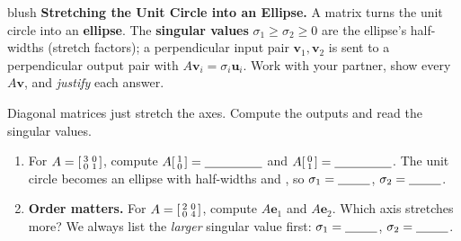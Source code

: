 \documentclass[10pt]{article}
\newcommand{\uu}{\mathbf{u}}
\newcommand{\vv}{\mathbf{v}}
\newcommand{\ee}{\mathbf{e}}
\begin{document}
\namepartnerperiod

\vspace{0.10in}

\begin{headlinebox}{blush}
\small\textbf{Stretching the Unit Circle into an Ellipse.} A matrix turns the unit circle into an
\textbf{ellipse}. The \textbf{singular values} $\sigma_1\ge\sigma_2\ge0$ are the ellipse's half-widths
(stretch factors); a perpendicular input pair $\vv_1,\vv_2$ is sent to a perpendicular output pair with
$A\vv_i=\sigma_i\uu_i$. Work with your partner, show every $A\vv$, and \emph{justify} each answer.
\end{headlinebox}

\vspace{0.10in}

\begin{tcolorbox}[colback=white, colframe=black!40, title=\textbf{Tier R --- Remediate},
    fonttitle=\bfseries, arc=1.5mm, left=3mm, right=3mm, top=2mm, bottom=2mm, breakable]
Diagonal matrices just stretch the axes. Compute the outputs and read the singular values.
\begin{enumerate}[leftmargin=1.7em, itemsep=8pt]
  \item For $A=\begin{bsmallmatrix} 3 & 0\\ 0 & 1 \end{bsmallmatrix}$, compute
        $A\begin{bsmallmatrix} 1\\ 0 \end{bsmallmatrix}=\blank{1.6cm}$ and
        $A\begin{bsmallmatrix} 0\\ 1 \end{bsmallmatrix}=\blank{1.6cm}$. The unit circle becomes an
        ellipse with half-widths \blank{1.0cm} and \blank{1.0cm}, so $\sigma_1=\blank{0.9cm}$,
        $\sigma_2=\blank{0.9cm}$.
  \item \textbf{Order matters.} For $A=\begin{bsmallmatrix} 2 & 0\\ 0 & 4 \end{bsmallmatrix}$, compute
        $A\ee_1$ and $A\ee_2$. Which axis stretches more? We always list the \emph{larger} singular
        value first: $\sigma_1=\blank{0.9cm}$, $\sigma_2=\blank{0.9cm}$. \writeline
\end{enumerate}
\end{tcolorbox}
\end{document}
